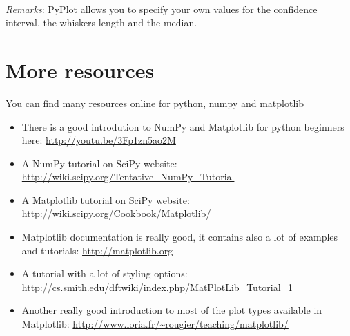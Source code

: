 \documentclass[article,10pt]{scrartcl}
\begin{document}
\paragraph{}
\emph{Remarks}: PyPlot allows you to specify your own values for the confidence interval, the whiskers length  and the median.

\section{More resources}
You can find many resources online for python, numpy and matplotlib
\begin{itemize}
\item There is a good introdution to NumPy and Matplotlib for python beginners here: \url{http://youtu.be/3Fp1zn5ao2M}
\item A NumPy tutorial on SciPy website: \url{http://wiki.scipy.org/Tentative_NumPy_Tutorial}
\item A Matplotlib tutorial on SciPy website: \url{http://wiki.scipy.org/Cookbook/Matplotlib/}
\item Matplotlib documentation is really good, it contains also a lot of examples and tutorials: \url{http://matplotlib.org}
\item A tutorial with a lot of styling options: \url{http://cs.smith.edu/dftwiki/index.php/MatPlotLib_Tutorial_1}
\item Another really good introduction to most of the plot types available in Matplotlib: \url{http://www.loria.fr/~rougier/teaching/matplotlib/}
\end{itemize}
\end{document}

